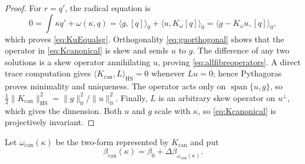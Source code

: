 \documentclass[11pt,a4paper]{article}
\theoremstyle{definition}
\theoremstyle{remark}
\newcommand{\spanof}{\operatorname{span}}
\begin{document}
\begin{proof}
For $r=q'$, the radical equation is
\[
 0=\int\kappa q'+\omega(\kappa,q)
  =\langle g,[q]\rangle_0+\langle u,K_\omega[q]\rangle_0
  =\langle g-K_\omega u,[q]\rangle_0,
\]
which proves \eqref{eq:KuEqualsg}.  Orthogonality \eqref{eq:guorthogonal} shows that the
operator in \eqref{eq:Kcanonical} is skew and sends $u$ to $g$.  The difference of any two
solutions is a skew operator annihilating $u$, proving \eqref{eq:allfibreoperators}.  A direct
trace computation gives
$\langle K_{\mathrm{can}},L\rangle_{\mathrm{HS}}=0$ whenever $Lu=0$; hence Pythagoras proves
minimality and uniqueness.  The operator acts only on $\spanof\{u,g\}$, so
$\tfrac12\|K_{\mathrm{can}}\|_{\mathrm{HS}}^2=\|g\|_0^2/\|u\|_0^2$.
Finally, $L$ is an arbitrary skew operator on $u^\perp$, which gives the dimension.  Both
$u$ and $g$ scale with $\kappa$, so \eqref{eq:Kcanonical} is projectively invariant.
\end{proof}

Let $\omega_{\mathrm{can}}(\kappa)$ be the two-form represented by
$K_{\mathrm{can}}$ and put
\begin{equation}\label{eq:betacankappa}
 \beta_{\mathrm{can}}(\kappa)
 =\beta_0+\Delta\beta_{\omega_{\mathrm{can}}(\kappa)}.
\end{equation}
\end{document}
